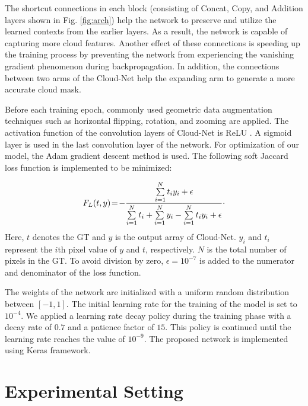 \documentclass{article}
\begin{document}
The shortcut connections in each block (consisting of Concat, Copy, and Addition layers shown in Fig. \ref{fig:arch}) help the network to preserve and utilize the learned contexts from the earlier layers. As a result, the network is capable of capturing more cloud features. Another effect of these connections is speeding up the training process by preventing the network from experiencing the vanishing gradient  phenomenon during backpropagation. In addition, the connections between two arms of the Cloud-Net help the expanding arm to generate a more accurate cloud mask.



Before each training epoch, commonly used geometric data augmentation techniques such as horizontal flipping, rotation, and zooming are applied. The activation function of the convolution layers of Cloud-Net is ReLU \cite{relu}. A sigmoid layer is used in the last convolution layer of the network. For optimization of our model, the Adam gradient descent method \cite{ADAM} is used. The following soft Jaccard loss function \cite{reza-unet,jacc1} is implemented to be minimized:

\vspace{-5mm}
\begin{equation}
\begin{split}
F_{L}(t,y) \! = \!-\dfrac{\sum\limits_{i=1}^{N} t_{i} y_i+\epsilon}{\sum\limits_{i=1}^{N} t_{i} + \sum\limits_{i=1}^{N} y_i - \sum\limits_{i=1}^{N} t_{i} y_i+\epsilon}\raisebox{0.7mm}{.}
\\ 
\end{split}
\label{Eq:loss}
\end{equation}
Here, $t$ denotes the GT and $y$ is the output array of Cloud-Net. $y_i$ and $t_{i}$ represent the $i$th pixel value of $y$ and $t$, respectively. $N$ is the total number of pixels in the GT. To avoid division by zero, $\epsilon = 10^{-7}$ is added to the numerator and denominator of the loss function.

The weights of the network are initialized with a uniform random distribution between $[-1, 1]$. The initial learning rate for the training of the model is set to $10^{-4}$. We applied a learning rate decay policy during the training phase with a decay rate of $0.7$ and a patience factor of $15$. This policy is continued until the learning rate reaches the value of $10^{-9}$. The proposed network is implemented using Keras framework.

\section{Experimental Setting}
\label{sec:pagestyle}
\end{document}
